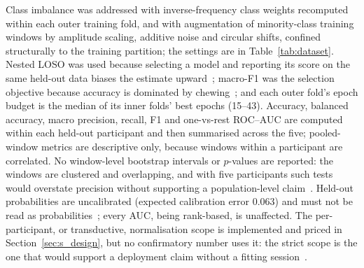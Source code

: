 \documentclass[journal]{IEEEtran}
\begin{document}
Class imbalance was addressed with inverse-frequency class weights recomputed within each outer training fold, and with augmentation of minority-class training windows by amplitude scaling, additive noise and circular shifts, confined structurally to the training partition; the settings are in Table~\ref{tab:dataset}. Nested LOSO was used because selecting a model and reporting its score on the same held-out data biases the estimate upward~\cite{cawley2010overfitting,varma2006bias}; macro-F1 was the selection objective because accuracy is dominated by chewing~\cite{chicco2020advantages}; and each outer fold's epoch budget is the median of its inner folds' best epochs (15--43). Accuracy, balanced accuracy, macro precision, recall, F1 and one-vs-rest ROC--AUC are computed within each held-out participant and then summarised across the five; pooled-window metrics are descriptive only, because windows within a participant are correlated. No window-level bootstrap intervals or $p$-values are reported: the windows are clustered and overlapping, and with five participants such tests would overstate precision without supporting a population-level claim~\cite{lehmann2006testing,demsar2006statistical}. Held-out probabilities are uncalibrated (expected calibration error 0.063) and must not be read as probabilities~\cite{guo2017calibration}; every AUC, being rank-based, is unaffected. The per-participant, or transductive, normalisation scope is implemented and priced in Section~\ref{sec:s_design}, but no confirmatory number uses it: the strict scope is the one that would support a deployment claim without a fitting session~\cite{besomi2020consensus}.
\end{document}
